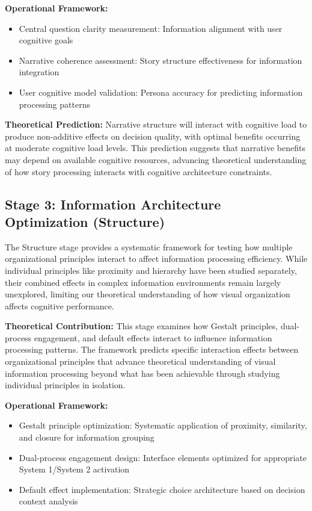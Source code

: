 \documentclass[
  authoryear,
  preprint]{elsarticle}
\providecommand{\tightlist}{%
  \setlength{\itemsep}{0pt}\setlength{\parskip}{0pt}}
\begin{document}
\textbf{Operational Framework:}

\begin{itemize}
\tightlist
\item
  Central question clarity measurement: Information alignment with user
  cognitive goals
\item
  Narrative coherence assessment: Story structure effectiveness for
  information integration
\item
  User cognitive model validation: Persona accuracy for predicting
  information processing patterns
\end{itemize}

\textbf{Theoretical Prediction:} Narrative structure will interact with
cognitive load to produce non-additive effects on decision quality, with
optimal benefits occurring at moderate cognitive load levels. This
prediction suggests that narrative benefits may depend on available
cognitive resources, advancing theoretical understanding of how story
processing interacts with cognitive architecture constraints.

\subsection{Stage 3: Information Architecture Optimization
(Structure)}\label{stage-3-information-architecture-optimization-structure}

The Structure stage provides a systematic framework for testing how
multiple organizational principles interact to affect information
processing efficiency. While individual principles like proximity and
hierarchy have been studied separately, their combined effects in
complex information environments remain largely unexplored, limiting our
theoretical understanding of how visual organization affects cognitive
performance.

\textbf{Theoretical Contribution:} This stage examines how Gestalt
principles, dual-process engagement, and default effects interact to
influence information processing patterns. The framework predicts
specific interaction effects between organizational principles that
advance theoretical understanding of visual information processing
beyond what has been achievable through studying individual principles
in isolation.

\textbf{Operational Framework:}

\begin{itemize}
\tightlist
\item
  Gestalt principle optimization: Systematic application of proximity,
  similarity, and closure for information grouping
\item
  Dual-process engagement design: Interface elements optimized for
  appropriate System 1/System 2 activation
\item
  Default effect implementation: Strategic choice architecture based on
  decision context analysis
\end{itemize}
\end{document}
